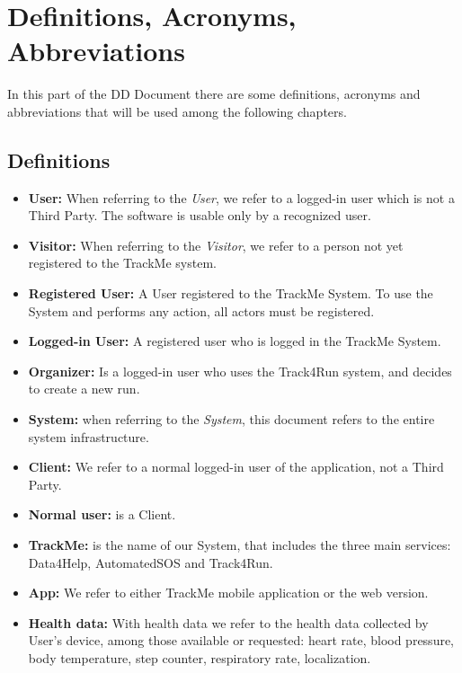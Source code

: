 \section{Definitions, Acronyms, Abbreviations}
In this part of the DD Document there are some definitions, acronyms and abbreviations that will be used among the following chapters.
\subsection{Definitions}
\begin{itemize}

\item \textbf{User:} When referring to the \emph{User}, we refer to a logged-in user which is not a Third Party. The software is usable only by a recognized user. 

\item \textbf{Visitor:} When referring to the \emph{Visitor}, we refer to a person not yet registered to the TrackMe system.

\item \textbf{Registered User:} A User registered to the TrackMe System. To use the System and performs any action, all actors must be registered. 

\item\textbf{Logged-in User:} A registered user who is logged in the TrackMe System.

\item\textbf{Organizer:} Is a logged-in user who uses the Track4Run system, and decides to create a new run.

\item \textbf{System:} when referring to the \emph{System}, this document refers to the entire system infrastructure.

\item \textbf{Client:} We refer to a normal logged-in user of the application, not a Third Party.

\item\textbf{Normal user:} is a Client.

\item\textbf{TrackMe:}
is the name of our System, that  includes the three main services: Data4Help, AutomatedSOS and Track4Run.

\item\textbf{App:} We refer to either TrackMe mobile application or the web version.

\item\textbf{Health data:} With health data we refer to the health data collected by User's device, among those available or requested: heart rate, blood pressure, body temperature, step counter, respiratory rate, localization.


\end{itemize}
